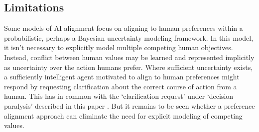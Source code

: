 \subsection{Limitations}



Some models of AI alignment \cite{russell2019human} focus on  aligning to human preferences within a probabilistic, perhaps a Bayesian uncertainty modeling framework.  In this model, it isn't necessary to explicitly model multiple competing human objectives. Instead, conflict between human values may be learned and represented implicitly as uncertainty over the action humans prefer. Where sufficient uncertainty exists, a sufficiently intelligent agent motivated to align to human preferences might respond by requesting clarification about the correct course of action from a human. This has in common with the `clarification request' under `decision paralysis' described in this paper%
. But it remains to be seen whether a preference alignment approach can eliminate the need for explicit modeling of competing values.

